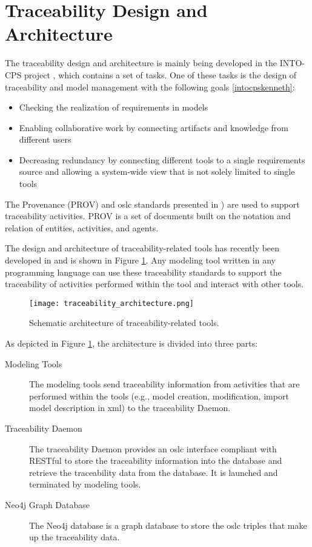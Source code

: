 \section{Traceability Design and Architecture}
\label{sec:tracaebilitydesign}


The traceability design and architecture is mainly being developed in the INTO-CPS project \cite{intocpspaper,intocps}, 
which contains a set of tasks. One of these tasks is the design of traceability and model management with the following goals \ref{intocpskenneth}:

\begin{itemize}
\item Checking the realization of requirements in models
\item Enabling collaborative work by connecting artifacts and knowledge from different users
\item Decreasing redundancy by connecting different tools to a single requirements source and allowing
a system-wide view that is not solely limited to single tools
\end{itemize}

The Provenance (PROV) \cite{provluc} and \acrshort{oslc} standards presented in \cite{intocpsjohn})
are used to support traceability activities. PROV is a set of documents built on the notation and relation of
entities, activities, and agents.

The design and architecture of traceability-related tools has recently been developed in \cite{intocpskenneth} and is shown in Figure \ref{fig:traceabilityarchitecture}. Any modeling tool written in any programming language can use these traceability standards to support the traceability of activities performed within the tool and interact with other tools.

\begin{figure}
	\texttt{[image: traceability\_architecture.png]}
	\caption{Schematic architecture of traceability-related tools.}
	\label{fig:traceabilityarchitecture}
\end{figure}


As depicted in Figure \ref{fig:traceabilityarchitecture}, the architecture is divided into three parts:

\begin{description}
\item[Modeling Tools] The modeling tools send traceability information from activities that are performed within the tools (e.g., model creation,
modification, import model description in \acrshort{xml}) to the traceability Daemon.
\item[Traceability Daemon] The traceability Daemon provides an \acrshort{oslc} interface compliant with RESTful \cite{restfulleonardo} to store the traceability 
information into the database and retrieve the traceability data from the database. It is launched and terminated by modeling tools.
\item[Neo4j Graph Database] The Neo4j database \cite{neo4j} is a graph database to store the \acrshort{oslc} triples that make up the traceability data. 

\end{description}

